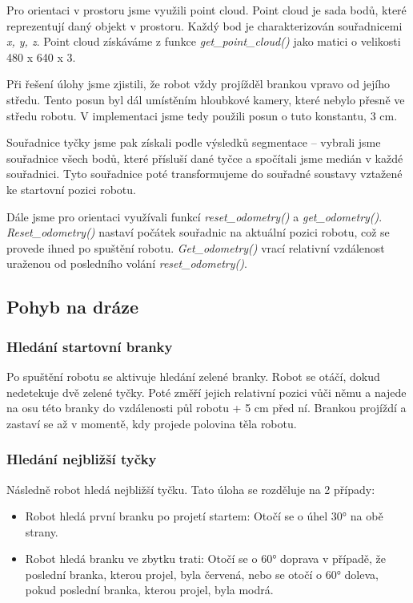 \documentclass{article}
\begin{document}
	Pro orientaci v prostoru jsme využili point cloud. Point cloud je sada bodů, které reprezentují daný objekt v prostoru. Každý bod je charakterizován souřadnicemi {\it x, y, z}. Point cloud získáváme z funkce {\it get\_point\_cloud()} jako matici o velikosti 480 x 640 x 3. 
	
	Při řešení úlohy  jsme zjistili, že robot vždy projížděl brankou vpravo od jejího středu. Tento posun byl dál umístěním hloubkové kamery, které nebylo přesně ve středu robotu. V implementaci jsme tedy použili posun o tuto konstantu, 3 cm.
	
	 Souřadnice tyčky jsme pak získali podle výsledků segmentace -- vybrali jsme souřadnice všech bodů, které přísluší dané tyčce a spočítali jsme medián v každé souřadnici. Tyto souřadnice poté transformujeme do souřadné soustavy vztažené ke startovní pozici robotu. 
	
	Dále jsme pro orientaci využívali funkcí {\it reset\_odometry()} a {\it get\_odometry()}. {\it Reset\_odometry()} nastaví počátek souřadnic na aktuální pozici robotu, což se provede ihned po spuštění robotu. {\it Get\_odometry()} vrací relativní vzdálenost uraženou od posledního volání {\it reset\_odometry()}. 

\subsection{Pohyb na dráze}

\subsubsection{Hledání startovní branky}
	
	Po spuštění robotu se aktivuje hledání zelené branky. Robot se otáčí, dokud nedetekuje dvě zelené tyčky. Poté změří jejich relativní pozici vůči němu a najede na osu této branky do vzdálenosti půl robotu + 5 cm před ní. Brankou projíždí a zastaví se až v momentě, kdy projede polovina těla robotu. 
	
\subsubsection{Hledání nejbližší tyčky}
	
	Následně robot hledá nejbližší tyčku. Tato úloha se rozděluje na 2 případy:

\begin{itemize}
	
	\item Robot hledá první branku po projetí startem: Otočí se o úhel 30° na obě strany. 
	
	\item Robot hledá branku ve zbytku trati: Otočí se o 60° doprava v případě, že poslední branka, kterou projel, byla červená, nebo se otočí o 60° doleva, pokud poslední branka, kterou projel, byla modrá. 
	

\end{itemize}
	
\end{document}
